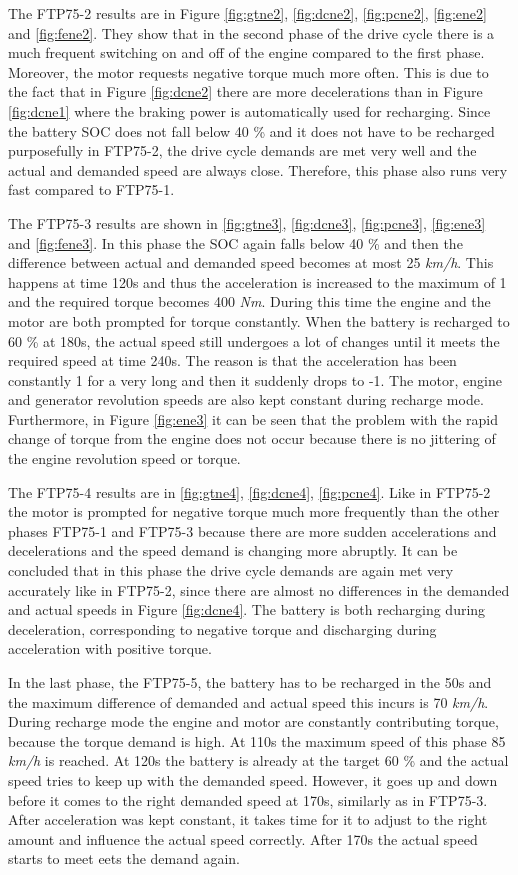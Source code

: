 The FTP75-2 results are in Figure \ref{fig:gtne2}, \ref{fig:dcne2}, \ref{fig:pcne2}, \ref{fig:ene2} and \ref{fig:fene2}. They show that in the second phase of the drive cycle there is a much frequent switching on and off of the engine compared to the first phase. Moreover, the motor requests negative torque much more often. This is due to the fact that in Figure \ref{fig:dcne2} there are more decelerations than in Figure \ref{fig:dcne1} where the braking power is automatically used for recharging. Since the battery SOC does not fall below 40 \% and it does not have to be recharged purposefully in FTP75-2, the drive cycle demands are met very well and the actual and demanded speed are always close. Therefore, this phase also runs very fast compared to FTP75-1.

The FTP75-3 results are shown in \ref{fig:gtne3}, \ref{fig:dcne3}, \ref{fig:pcne3}, \ref{fig:ene3} and \ref{fig:fene3}. In this phase the SOC again falls below 40 \% and then the difference between actual and demanded speed becomes at most 25 \textit{km/h}. This happens at time 120s and thus the acceleration is increased to the maximum of 1 and the required torque becomes 400 \textit{Nm}. During this time the engine and the motor are both prompted for torque constantly. When the battery is recharged to 60 \% at 180s, the actual speed still undergoes a lot of changes until it meets the required speed at time 240s. The reason is that the acceleration has been constantly 1 for a very long and then it suddenly drops to -1. The motor, engine and generator revolution speeds are also kept constant during recharge mode. Furthermore, in Figure \ref{fig:ene3} it can be seen that the problem with the rapid change of torque from the engine does not occur because there is no jittering of the engine revolution speed or torque.

The FTP75-4 results are in \ref{fig:gtne4}, \ref{fig:dcne4}, \ref{fig:pcne4}. Like in FTP75-2 the motor is prompted for negative torque much more frequently than the other phases FTP75-1 and FTP75-3 because there are more sudden accelerations and decelerations and the speed demand is changing more abruptly. It can be concluded that in this phase the drive cycle demands are again met very accurately like in FTP75-2, since there are almost no differences in the demanded and actual speeds in Figure \ref{fig:dcne4}. The battery is both recharging during deceleration, corresponding to negative torque and discharging during acceleration with positive torque.

In the last phase, the FTP75-5, the battery has to be recharged in the 50s and the maximum difference of demanded and actual speed this incurs is 70 \textit{km/h}. During recharge mode the engine and motor are constantly contributing torque, because the torque demand is high. At 110s the maximum speed of this phase 85 \textit{km/h} is reached. At 120s the battery is already at the target 60 \% and the actual speed tries to keep up with the demanded speed. However, it goes up and down before it comes to the right demanded speed at 170s, similarly as in FTP75-3. After acceleration was kept constant, it takes time for it to adjust to the right amount and influence the actual speed correctly. After 170s the actual speed starts to meet eets the demand again. 

